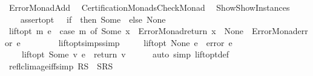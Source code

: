 %
\begin{isabellebody}%
%
%
\isadelimtheory
%
\endisadelimtheory
%
\isatagtheory
{}\isamarkupfalse%
\ Error{\isacharunderscore}{\kern0pt}Monad{\isacharunderscore}{\kern0pt}Add\isanewline
{}\isanewline
\ \ {\isachardoublequoteopen}Certification{\isacharunderscore}{\kern0pt}Monads{\isachardot}{\kern0pt}Check{\isacharunderscore}{\kern0pt}Monad{\isachardoublequoteclose}\isanewline
\ \ {\isachardoublequoteopen}Show{\isachardot}{\kern0pt}Show{\isacharunderscore}{\kern0pt}Instances{\isachardoublequoteclose}\isanewline
{}%
\endisatagtheory
{\isafoldtheory}%
%
\isadelimtheory
\isanewline
%
\endisadelimtheory
\ \ \ \ \isanewline
\ \ \isamarkupfalse%
\ {\isachardoublequoteopen}assert{\isacharunderscore}{\kern0pt}opt\ {\isasymPhi}\ {\isasymequiv}\ if\ {\isasymPhi}\ then\ Some\ {\isacharparenleft}{\kern0pt}{\isacharparenright}{\kern0pt}\ else\ None{\isachardoublequoteclose}\ \ \isanewline
\isanewline
\ \ \isamarkupfalse%
\ {\isachardoublequoteopen}lift{\isacharunderscore}{\kern0pt}opt\ m\ e\ {\isasymequiv}\ case\ m\ of\ Some\ x\ {\isasymRightarrow}\ Error{\isacharunderscore}{\kern0pt}Monad{\isachardot}{\kern0pt}return\ x\ {\isacharbar}{\kern0pt}\ None\ {\isasymRightarrow}\ Error{\isacharunderscore}{\kern0pt}Monad{\isachardot}{\kern0pt}error\ e{\isachardoublequoteclose}\isanewline
\ \ \ \ \isanewline
\ \ \isamarkupfalse%
\ lift{\isacharunderscore}{\kern0pt}opt{\isacharunderscore}{\kern0pt}simps{\isacharbrackleft}{\kern0pt}simp{\isacharbrackright}{\kern0pt}{\isacharcolon}{\kern0pt}\ \isanewline
\ \ \ \ {\isachardoublequoteopen}lift{\isacharunderscore}{\kern0pt}opt\ None\ e\ {\isacharequal}{\kern0pt}\ error\ e{\isachardoublequoteclose}\isanewline
\ \ \ \ {\isachardoublequoteopen}lift{\isacharunderscore}{\kern0pt}opt\ {\isacharparenleft}{\kern0pt}Some\ v{\isacharparenright}{\kern0pt}\ e\ {\isacharequal}{\kern0pt}\ return\ v{\isachardoublequoteclose}\isanewline
%
\isadelimproof
\ \ \ \ %
\endisadelimproof
%
\isatagproof
{}\isamarkupfalse%
\ {\isacharparenleft}{\kern0pt}auto\ simp{\isacharcolon}{\kern0pt}\ lift{\isacharunderscore}{\kern0pt}opt{\isacharunderscore}{\kern0pt}def{\isacharparenright}{\kern0pt}%
\endisatagproof
{\isafoldproof}%
%
\isadelimproof
\isanewline
%
\endisadelimproof
\ \ \isanewline
\ \ \ \ \isanewline
\ \ \isamarkupfalse%
\ reflcl{\isacharunderscore}{\kern0pt}image{\isacharunderscore}{\kern0pt}iff{\isacharbrackleft}{\kern0pt}simp{\isacharbrackright}{\kern0pt}{\isacharcolon}{\kern0pt}\ {\isachardoublequoteopen}R\isactrlsup {\isacharequal}{\kern0pt}{\isacharbackquote}{\kern0pt}{\isacharbackquote}{\kern0pt}S\ {\isacharequal}{\kern0pt}\ S{\isasymunion}R{\isacharbackquote}{\kern0pt}{\isacharbackquote}{\kern0pt}S{\isachardoublequoteclose}%

\end{isabellebody}
